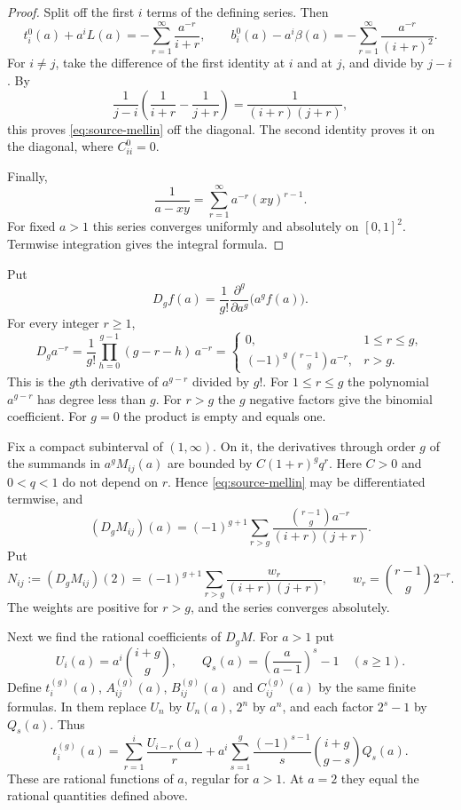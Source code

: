 \begin{proof}
Split off the first $i$ terms of the defining series. Then
\[
t_i^0(a)+a^iL(a)
 =-\sum_{r=1}^{\infty}\frac{a^{-r}}{i+r},\qquad
b_i^0(a)-a^i\beta(a)
 =-\sum_{r=1}^{\infty}\frac{a^{-r}}{(i+r)^2}.
\]
For $i\ne j$, take the difference of the first identity at $i$ and at $j$,
and divide by $j-i$. By
\[
\frac1{j-i}\left(\frac1{i+r}-\frac1{j+r}\right)
 =\frac1{(i+r)(j+r)},
\]
this proves \eqref{eq:source-mellin} off the diagonal. The second identity
proves it on the diagonal, where $C^0_{ii}=0$.

Finally,
\[
\frac1{a-xy}=\sum_{r=1}^{\infty}a^{-r}(xy)^{r-1}.
\]
For fixed $a>1$ this series converges uniformly and absolutely on
$[0,1]^2$. Termwise integration gives the integral formula.
\end{proof}

Put
\[
D_g f(a)=\frac1{g!}\frac{\partial^g}{\partial a^g}
                         \bigl(a^g f(a)\bigr).
\]
For every integer $r\ge1$,
\[
D_g a^{-r}
 =\frac1{g!}\prod_{h=0}^{g-1}(g-r-h)\,a^{-r}
 =
\begin{cases}
0,&1\le r\le g,\\[2pt]
(-1)^g\binom{r-1}{g}a^{-r},&r>g.
\end{cases}
\]
This is the $g$th derivative of $a^{g-r}$ divided by $g!$. For
$1\le r\le g$ the polynomial $a^{g-r}$ has degree less than $g$. For $r>g$
the $g$ negative factors give the binomial coefficient. For $g=0$ the
product is empty and equals one.

Fix a compact subinterval of $(1,\infty)$. On it, the derivatives through
order $g$ of the summands in $a^gM_{ij}(a)$ are bounded by $C(1+r)^gq^r$.
Here $C>0$ and $0<q<1$ do not depend on $r$. Hence
\eqref{eq:source-mellin} may be differentiated termwise, and
\[
(D_gM_{ij})(a)
 =(-1)^{g+1}\sum_{r>g}
       \frac{\binom{r-1}{g}a^{-r}}{(i+r)(j+r)}.
\]
Put
\begin{equation}\label{eq:source-N}
N_{ij}:=(D_gM_{ij})(2)
 =(-1)^{g+1}\sum_{r>g}\frac{w_r}{(i+r)(j+r)},
\qquad
w_r=\binom{r-1}{g}2^{-r}.
\end{equation}
The weights are positive for $r>g$, and the series converges absolutely.

Next we find the rational coefficients of $D_gM$. For $a>1$ put
\[
U_i(a)=a^i\binom{i+g}{g},\qquad
Q_s(a)=\left(\frac{a}{a-1}\right)^s-1\quad(s\ge1).
\]
Define $t_i^{(g)}(a)$, $A^{(g)}_{ij}(a)$, $B^{(g)}_{ij}(a)$ and
$C^{(g)}_{ij}(a)$ by the same finite formulas. In them replace $U_n$ by
$U_n(a)$, $2^n$ by $a^n$, and each factor $2^s-1$ by $Q_s(a)$. Thus
\[
t_i^{(g)}(a)
 =\sum_{r=1}^{i}\frac{U_{i-r}(a)}r
  +a^i\sum_{s=1}^{g}\frac{(-1)^{s-1}}s
          \binom{i+g}{g-s}Q_s(a).
\]
These are rational functions of $a$, regular for $a>1$. At $a=2$ they equal
the rational quantities defined above.

